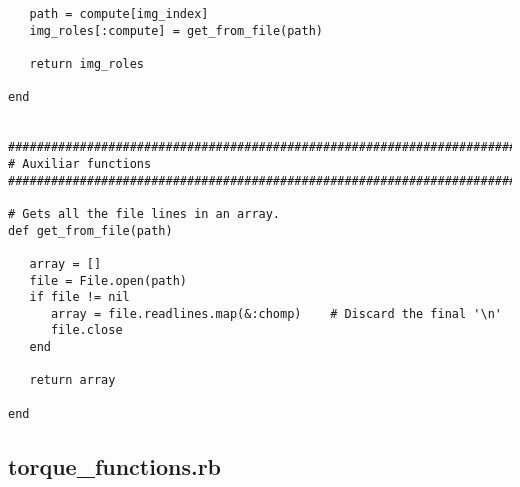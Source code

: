 \begin{lstlisting}
   path = compute[img_index]
   img_roles[:compute] = get_from_file(path)
   
   return img_roles
   
end


################################################################################
# Auxiliar functions
################################################################################

# Gets all the file lines in an array.
def get_from_file(path)

   array = []
   file = File.open(path)
   if file != nil
      array = file.readlines.map(&:chomp)    # Discard the final '\n'
      file.close
   end

   return array

end
\end{lstlisting}


\subsection{torque\_functions.rb}



